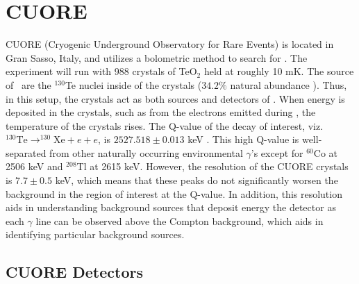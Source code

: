\chapter{CUORE}
\label{ch:CUORE}
CUORE (Cryogenic Underground Observatory for Rare Events) is located in Gran Sasso, Italy, and utilizes a bolometric method to search for \zeronubb. The experiment will run with 988 crystals of TeO$_2$ held at roughly 10 mK.
The source of \zeronubb~are the $^{130}$Te nuclei inside of the crystals ($34.2\%$ natural abundance \cite{Fehr200483}).
Thus, in this setup, the crystals act as both sources and detectors of \zeronubb. When energy is deposited in the crystals, such as from the electrons emitted during \zeronubb, the temperature of the crystals rises.
The Q-value of the decay of interest, viz. $^{130}\textrm{Te} \rightarrow ^{130}\textrm{Xe} + e + e$, is $2527.518\pm 0.013$ keV \cite{Redshaw:2009cf, Scielzo:2009nh, Rahaman:2011zz}.
This high Q-value is well-separated from other naturally occurring environmental $\gamma$'s except for $^{60}$Co at 2506 keV and $^{208}$Tl at 2615 keV.
However, the resolution of the CUORE crystals is $7.7\pm0.5$ keV, which means that these peaks do not significantly worsen the background in the region of interest at the Q-value.
In addition, this resolution aids in understanding background sources that deposit energy the detector as each $\gamma$ line can be observed above the Compton background, which aids in identifying particular background sources.

\section{CUORE Detectors}


